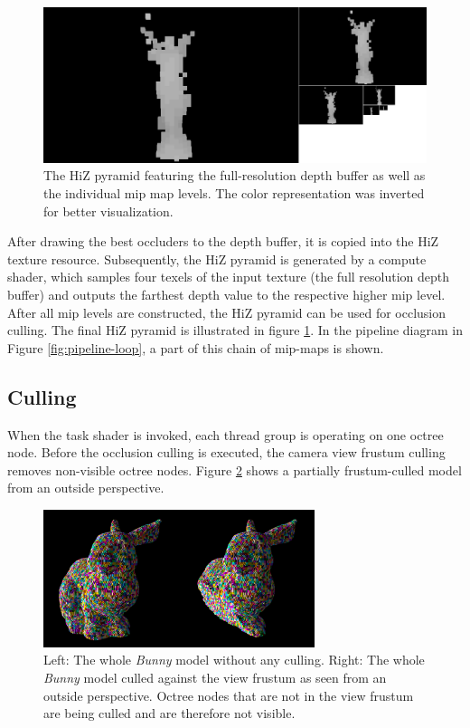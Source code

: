 \begin{figure}[!htb]
    \centering
    \includegraphics[width=\linewidth]{images/graphics/lucy-hiz-pyramid-inverted.jpg}
    \caption{The \ac{HiZ} pyramid featuring the full-resolution depth buffer as well as the individual mip map 
    levels. The color representation was inverted for better visualization.}
    \label{fig:lucy-hiz-pyramid}
\end{figure}

\noindent
After drawing the best occluders to the depth buffer, it is copied into the \ac{HiZ} texture resource. Subsequently, 
the \ac{HiZ} pyramid is generated by a compute shader, which samples four texels of the input texture (the full resolution 
depth buffer) and outputs the farthest depth value to the respective higher mip level. After all mip levels are constructed, 
the \ac{HiZ} pyramid can be used for occlusion culling. The final \ac{HiZ} pyramid is illustrated in figure 
\ref{fig:lucy-hiz-pyramid}. In the pipeline diagram in Figure \ref{fig:pipeline-loop}, a part of this chain of mip-maps is shown.

\subsection*{Culling} \label{subsec-task-shader}

When the task shader is invoked, each thread group is operating on one octree node. Before the 
occlusion culling is executed, the camera view frustum culling removes non-visible octree nodes. 
Figure \ref{fig:bunny-frustum-culling} shows a partially frustum-culled model from an outside 
perspective. \\

\begin{figure}[!htb]
    \centering
    \includegraphics[width=300px]{images/graphics/bunny-frustum-culling.jpg}
    \caption{Left: The whole \emph{Bunny} model without any culling. 
    Right: The whole \emph{Bunny} model culled against the view frustum as seen from an outside perspective. 
    Octree nodes that are not in the view frustum are being culled and are therefore not visible.}
    \label{fig:bunny-frustum-culling}
\end{figure}

